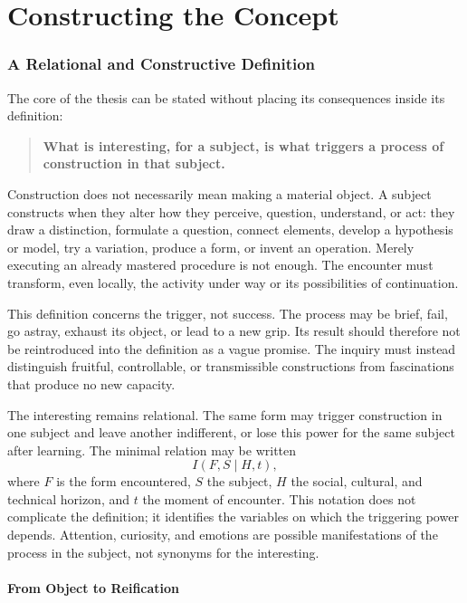 \documentclass[11pt,a4paper]{article}
\begin{document}
\part{Constructing the Concept}

\section{A Relational and Constructive Definition}

The core of the thesis can be stated without placing its consequences inside
its definition:

\begin{quote}
\textbf{What is interesting, for a subject, is what triggers a process of
construction in that subject.}
\end{quote}

Construction does not necessarily mean making a material object. A subject
constructs when they alter how they perceive, question, understand, or act:
they draw a distinction, formulate a question, connect elements, develop a
hypothesis or model, try a variation, produce a form, or invent an operation.
Merely executing an already mastered procedure is not enough. The encounter
must transform, even locally, the activity under way or its possibilities of
continuation.

This definition concerns the trigger, not success. The process may be brief,
fail, go astray, exhaust its object, or lead to a new grip. Its result should
therefore not be reintroduced into the definition as a vague promise. The
inquiry must instead distinguish fruitful, controllable, or transmissible
constructions from fascinations that produce no new capacity.

The interesting remains relational. The same form may trigger construction in
one subject and leave another indifferent, or lose this power for the same
subject after learning. The minimal relation may be written
\[
  I(F,S\mid H,t),
\]
where \(F\) is the form encountered, \(S\) the subject, \(H\) the social,
cultural, and technical horizon, and \(t\) the moment of encounter. This
notation does not complicate the definition; it identifies the variables on
which the triggering power depends. Attention, curiosity, and emotions are
possible manifestations of the process in the subject, not synonyms for the
interesting.

\subsection{From Object to Reification}
\end{document}
